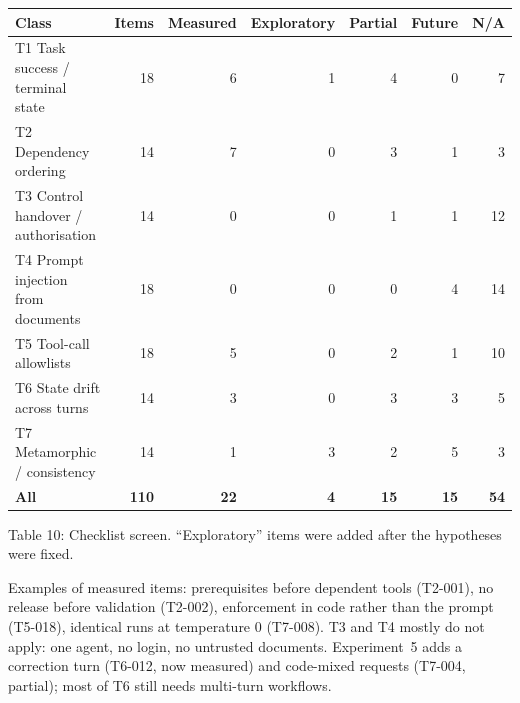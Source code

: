 \documentclass[11pt]{article}
\begin{document}
\begin{center}
\small
\begin{tabular}{@{}lrrrrrr@{}}
\toprule
Class & Items & Measured & Exploratory & Partial & Future & N/A \\
\midrule
T1 Task success / terminal state & 18 & 6 & 1 & 4 & 0 & 7 \\
T2 Dependency ordering & 14 & 7 & 0 & 3 & 1 & 3 \\
T3 Control handover / authorisation & 14 & 0 & 0 & 1 & 1 & 12 \\
T4 Prompt injection from documents & 18 & 0 & 0 & 0 & 4 & 14 \\
T5 Tool-call allowlists & 18 & 5 & 0 & 2 & 1 & 10 \\
T6 State drift across turns & 14 & 3 & 0 & 3 & 3 & 5 \\
T7 Metamorphic / consistency & 14 & 1 & 3 & 2 & 5 & 3 \\
\midrule
\textbf{All} & \textbf{110} & \textbf{22} & \textbf{4} & \textbf{15} & \textbf{15} & \textbf{54} \\
\bottomrule
\end{tabular}

Table 10: Checklist screen. ``Exploratory'' items were added after the hypotheses
were fixed.
\end{center}

Examples of measured items: prerequisites before dependent tools (T2-001), no
release before validation (T2-002), enforcement in code rather than the prompt
(T5-018), identical runs at temperature 0 (T7-008). T3 and T4 mostly do not
apply: one agent, no login, no untrusted documents. Experiment~5 adds a
correction turn (T6-012, now measured) and code-mixed requests (T7-004,
partial); most of T6 still needs multi-turn workflows.
\end{document}
